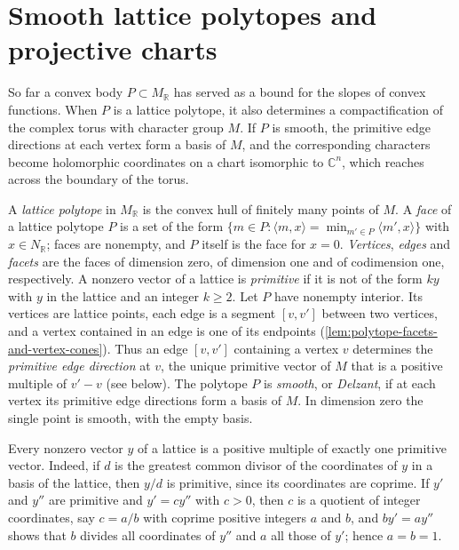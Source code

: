 \section{Smooth lattice polytopes and projective charts}
\label{sec:delzant-projective-charts}
So far a convex body $P\subset M_{\mathbb R}$ has served as a bound for the slopes of convex functions. When $P$ is a lattice polytope, it also determines a compactification of the complex torus with character group $M$. If $P$ is smooth, the primitive edge directions at each vertex form a basis of $M$, and the corresponding characters become holomorphic coordinates on a chart isomorphic to $\mathbb C^n$, which reaches across the boundary of the torus.

\begin{definition}\label{def:delzant-lattice-polytope}
A \emph{lattice polytope} in $M_{\mathbb R}$ is the convex hull of finitely many points of $M$. A \emph{face} of a lattice polytope $P$ is a set of the form $\{m\in P:\langle m,x\rangle=\min_{m'\in P}\langle m',x\rangle\}$ with $x\in N_{\mathbb R}$; faces are nonempty, and $P$ itself is the face for $x=0$. \emph{Vertices}, \emph{edges} and \emph{facets} are the faces of dimension zero, of dimension one and of codimension one, respectively. A nonzero vector of a lattice is \emph{primitive} if it is not of the form $ky$ with $y$ in the lattice and an integer $k\geq2$. Let $P$ have nonempty interior. Its vertices are lattice points, each edge is a segment $[v,v']$ between two vertices, and a vertex contained in an edge is one of its endpoints (\cref{lem:polytope-facets-and-vertex-cones}). Thus an edge $[v,v']$ containing a vertex $v$ determines the \emph{primitive edge direction} at $v$, the unique primitive vector of $M$ that is a positive multiple of $v'-v$ (see below). The polytope $P$ is \emph{smooth}, or \emph{Delzant}, if at each vertex its primitive edge directions form a basis of $M$. In dimension zero the single point is smooth, with the empty basis.
\end{definition}

Every nonzero vector $y$ of a lattice is a positive multiple of exactly one primitive vector. Indeed, if $d$ is the greatest common divisor of the coordinates of $y$ in a basis of the lattice, then $y/d$ is primitive, since its coordinates are coprime. If $y'$ and $y''$ are primitive and $y'=cy''$ with $c>0$, then $c$ is a quotient of integer coordinates, say $c=a/b$ with coprime positive integers $a$ and $b$, and $by'=ay''$ shows that $b$ divides all coordinates of $y''$ and $a$ all those of $y'$; hence $a=b=1$.

